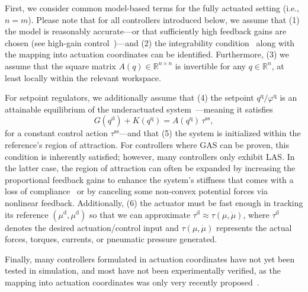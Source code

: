 First, we consider common model-based terms for the fully actuated setting (i.e., $n = m$). Please note that for all controllers introduced below, we assume that (1) the model is reasonably accurate—or that sufficiently high feedback gains are chosen (see high-gain control~\citep{marino1985high})—and (2) the integrability condition~\citep{pustina2024input} along with the mapping into actuation coordinates can be identified. Furthermore, (3) we assume that the square matrix $A(q) \in \mathbb{R}^{n \times n}$ is invertible for any $q \in \mathbb{R}^n$, at least locally within the relevant workspace.

For setpoint regulators, we additionally assume that (4) the setpoint $q^\mathrm{q}/\varphi^\mathrm{q}$ is an attainable equilibrium of the underactuated system~\citep{pustina2022feedback}—meaning it satisfies
\begin{equation}
    G(q^\mathrm{d}) + K(q^\mathrm{q}) = A(q^\mathrm{q}) \, \tau^\mathrm{ss},
\end{equation}
for a constant control action $\tau^\mathrm{ss}$—and that (5) the system is initialized within the reference’s region of attraction. For controllers where \gls{GAS} can be proven, this condition is inherently satisfied; however, many controllers only exhibit \gls{LAS}. In the latter case, the region of attraction can often be expanded by increasing the proportional feedback gains to enhance the system’s stiffness that comes with a loss of compliance~\citep{della2017controlling, della2023model} or by canceling some non-convex potential forces via nonlinear feedback. Additionally, (6) the actuator must be fast enough in tracking its reference $(\mu^\mathrm{d}, \mu^\mathrm{d})$ so that we can approximate $\tau^\mathrm{d} \approx \tau(\mu,\dot{\mu})$, where $\tau^\mathrm{d}$ denotes the desired actuation/control input and $\tau(\mu,\dot{\mu})$ represents the actual forces, torques, currents, or pneumatic pressure generated.

Finally, many controllers formulated in actuation coordinates have not yet been tested in simulation, and most have not been experimentally verified, as the mapping into actuation coordinates was only very recently proposed~\citep{pustina2024input}.

